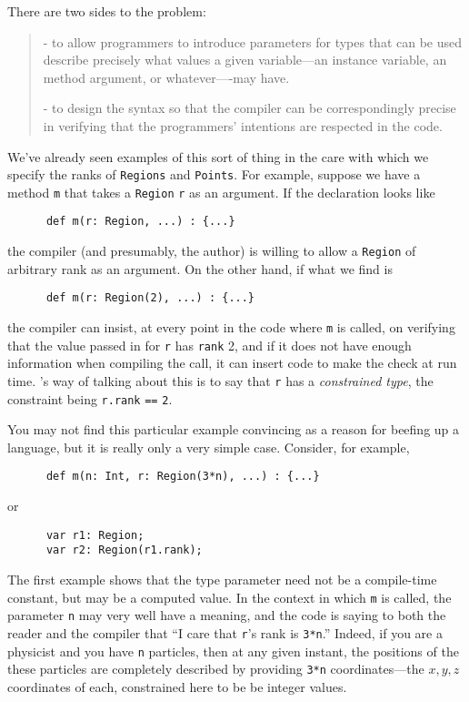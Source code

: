 There are two sides to the problem:
\begin{quote}
- to allow programmers to introduce parameters for types that can be used
describe precisely what values a given variable---an instance variable, an method
argument, or whatever----may have.

- to design the syntax so that the compiler can be correspondingly 
precise in verifying that the programmers' intentions are respected in the
code.
\end{quote}
We've already seen examples of this sort of thing in the care with which
we specify the ranks of {\tt Regions} and {\tt Points}.
For example, suppose we have a method {\tt m} that takes a
{\tt Region} {\tt r} as an argument.  If the declaration looks like
\begin{verbatim}
      def m(r: Region, ...) : {...}
\end{verbatim}
the compiler (and presumably, the author) is willing to allow a {\tt Region}
of arbitrary rank as an argument.  On the other hand, if what we find is
\begin{verbatim}
      def m(r: Region(2), ...) : {...}
\end{verbatim}
the compiler can insist, at every point in the code where {\tt m} is called,
on verifying that the value passed in for  {\tt r} has {\tt rank} 2, and if it does
not have enough 
information when compiling the call, it can insert code to make the check
at run time.  \Xten's way of talking about this is to say that {\tt r} has a
{\em constrained type}, the constraint being {\tt r.rank} {\tt ==} {\tt 2}.

You may not find this particular example convincing as a reason for beefing
up a language, but it is really only a very simple case.  Consider, for example,
\begin{verbatim}
      def m(n: Int, r: Region(3*n), ...) : {...}
\end{verbatim}
or
\begin{verbatim}
      var r1: Region;
      var r2: Region(r1.rank);
\end{verbatim}
The first example shows that the type parameter need not be a compile-time
constant, but may be a computed value.  In the context in which {\tt m}
is called, the parameter {\tt n} may very well have a meaning, and the
code is saying  to both the reader and the compiler that 
``I care that {\tt r}'s rank is {\tt 3*n}.''  Indeed, if you are a physicist
and you have {\tt n} particles, then at any given instant, the positions
of the these particles are completely described by providing {\tt 3*n}
coordinates---the $x,y,z$ coordinates of each, constrained here to be
be integer values.

